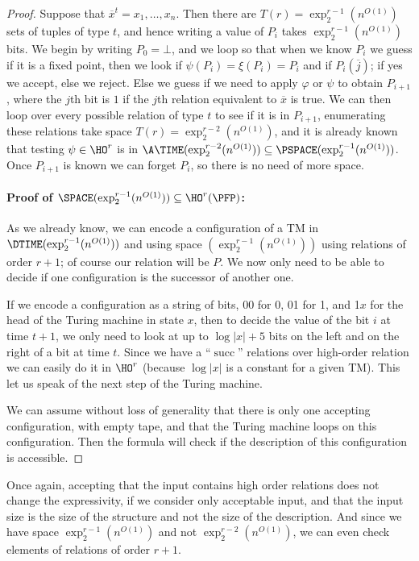 \documentclass[a4paper,12pt]{article}
\theoremstyle{definition}
\renewcommand{\phi}{\varphi}
\newcommand{\hoa}[1]{\ensuremath{\HO^{#1}}}
\DeclareMathOperator{\suc}{succ}
\newcommand{\ol}{\overline}
\begin{document}
\begin{proof}
Suppose that $\ol x^{t}=x_1,\dots,x_n$. Then there are
$T(r)=\exp^{r-1}_2(n^{O(1)})$ sets of tuples of type $t$, and hence
writing a value of $P_{i}$ takes $\exp^{r-1}_2(n^{O(1)})$ bits. We
begin by writing $P_{0}=\bot$, and we loop so that when we know
$P_{i}$ we guess if it is a fixed point, then we look if
$\psi(P_{i})=\xi(P_{i})=P_{i}$ and if $P_{i}(\ol j)$; if yes we
accept, else we reject. Else we guess if we need to apply $\phi$ or
$\psi$ to obtain $P_{i+1}$, where the $j$th bit is $1$ if the $j$th
relation equivalent to $\ol x$ is true. We can then loop over every
possible relation of type $t$ to see if it is in $P_{i+1}$,
enumerating these relations take space $T(r)=\exp^{r-2}_2(n^{O(1)})$,
and it is already known that testing $\psi\in \hoa{r}$ is in
$\A\TIME(\exp^{r-2}_{2}(n^{O(1)}))\subseteq
\PSPACE(\exp^{r-1}_{2}(n^{O(1)}))$. Once $P_{i+1}$ is known we can
forget $P_{i}$, so there is no need of more space.

\paragraph{Proof of $\SPACE(\exp_{2}^{r-1}(n^{O(1)}))\subseteq\hoa{r}(\PFP)$:}
As we already know, we can encode a configuration of a TM in
$\DTIME(\exp_{2}^{r-1}(n^{O(1)}))$ and using space
$(\exp^{r-1}_2(n^{O(1)}))$ using relations of order $r+1$; of course
our relation will be $P$. We now only need to be able to decide if one
configuration is the successor of another one.

If we encode a configuration as a string of bits, 00 for 0, 01 for 1,
and 1$x$ for the head of the Turing machine in state $x$, then to
decide the value of the bit $i$ at time $t+1$, we only need to look at
up to $\log |x|+5$ bits on the left and on the right of a bit at time
$t$. Since we have a ``$\suc$'' relations over high-order relation we can
easily do it in $\hoa{r}$ (because $\log|x|$ is a constant for a given
TM). This let us speak of the next step of the Turing machine.



We can assume without loss of generality that there is only one
accepting configuration, with empty tape, and that the Turing machine
loops on this configuration. Then the formula will check if the
description of this configuration is accessible.
\end{proof}


Once again, accepting that the input contains high order relations does
not change the expressivity, if we consider only acceptable input, and that the
input size is the size of the structure and not the size of the
description. And since we have space $\exp_{2}^{r-1}(n^{O(1)})$ and
not $\exp_{2}^{r-2}(n^{O(1)})$, we can even check elements of relations
of order $r+1$.
\end{document}
